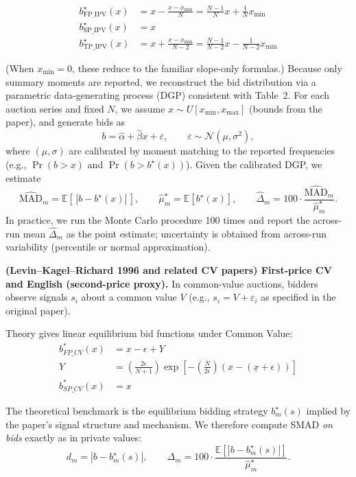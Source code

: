 $$\begin{aligned}
b^\star_{\mathrm{FP\_IPV}}(x) &= x - \frac{x-x_{\min}}{N} = \frac{N-1}{N}x + \frac{1}{N}x_{\min} \\
b^\star_{\mathrm{SP\_IPV}}(x) &= x \\
b^\star_{\mathrm{TP\_IPV}}(x) &= x + \frac{x-x_{\min}}{N-2} = \frac{N-1}{N-2}x - \frac{1}{N-2}x_{\min}
\end{aligned}$$

(When $x_{\min}=0$, these reduce to the familiar slope-only formulas.)
Because only summary moments are reported, we reconstruct the bid distribution via a parametric data-generating process (DGP) consistent with Table~2.
For each auction series and fixed $N$, we assume $x\sim U[x_{\min},x_{\max}]$ (bounds from the paper), and generate bids as
\[
b = \hat\alpha+\hat\beta x + \varepsilon,\qquad \varepsilon\sim \mathcal N(\mu,\sigma^2),
\]
where $(\mu,\sigma)$ are calibrated by moment matching to the reported frequencies (e.g., $\Pr(b>x)$ and $\Pr(b>b^\star(x))$).
Given the calibrated DGP, we estimate
\[
\widehat{\mathrm{MAD}}_m = \mathbb E\!\left[\,|b-b^\star(x)|\,\right],
\qquad
\widehat{\mu}_m^\star=\mathbb E[b^\star(x)],
\qquad
\widehat{\Delta}_m = 100\cdot \frac{\widehat{\mathrm{MAD}}_m}{\widehat{\mu}_m^\star}.
\]
In practice, we run the Monte Carlo procedure 100 times and report the across-run mean $\widehat{\Delta}_m$ as the point estimate; uncertainty is obtained from across-run variability (percentile or normal approximation).


\textbf{(Levin--Kagel--Richard 1996 and related CV papers) First-price CV and English (second-price proxy).}
In common-value auctions, bidders observe signals $s_i$ about a common value $V$ (e.g., $s_i=V+\varepsilon_i$ as specified in the original paper). 

Theory gives linear equilibrium bid functions under Common Value:
$$\begin{aligned}
b^*_{FP\_CV}(x) &= x - \epsilon + Y\\
Y &= \left( \frac{2\epsilon}{N+1} \right) \exp\left[ -\left( \frac{N}{2\epsilon} \right) (x - (\underline{x} + \epsilon)) \right]\\
b^*_{SP\_CV}(x) &= x
\end{aligned}$$

The theoretical benchmark is the equilibrium bidding strategy $b_m^\star(s)$ implied by the paper's signal structure and mechanism. We therefore compute SMAD \emph{on bids} exactly as in private values:
\[
d_m = |b - b_m^\star(s)|,
\qquad
\Delta_m = 100\cdot \frac{\mathbb E[|b-b_m^\star(s)|]}{\widehat{\mu}_m^\star}.
\]

